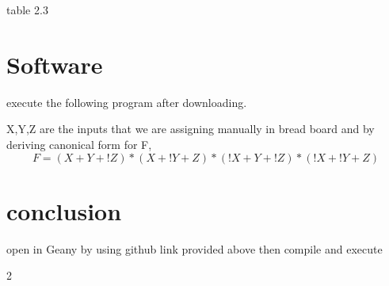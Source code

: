 \documentclass{article}
\begin{document}
\begin{multicols}{2}
    \label{table1}
table 2.3
\section{Software}
execute the following program after
downloading.
\vspace{10mm}

X,Y,Z are the inputs that we are assigning manually in bread board and by deriving canonical form for F,
\begin{equation}
F=(X+Y+!Z)*(X+!Y+Z)*(!X+Y+!Z)*(!X+!Y+Z)
\end{equation}
\section{conclusion}
open in Geany by using github link provided above then compile and execute 
\end{multicols}{2}
\end{document}
